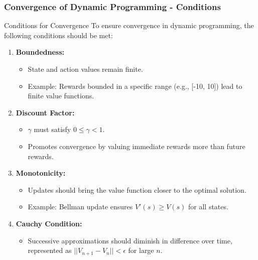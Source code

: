 \documentclass{beamer}
\begin{document}
\begin{frame}[fragile]
    \frametitle{Convergence of Dynamic Programming - Conditions}
    \begin{block}{Conditions for Convergence}
        To ensure convergence in dynamic programming, the following conditions should be met:
        \begin{enumerate}
            \item \textbf{Boundedness:} 
                \begin{itemize}
                    \item State and action values remain finite.
                    \item Example: Rewards bounded in a specific range (e.g., [-10, 10]) lead to finite value functions.
                \end{itemize}
            \item \textbf{Discount Factor:} 
                \begin{itemize}
                    \item $\gamma$ must satisfy $0 \leq \gamma < 1$.
                    \item Promotes convergence by valuing immediate rewards more than future rewards.
                \end{itemize}
            \item \textbf{Monotonicity:} 
                \begin{itemize}
                    \item Updates should bring the value function closer to the optimal solution.
                    \item Example: Bellman update ensures $V'(s) \geq V(s)$ for all states.
                \end{itemize}
            \item \textbf{Cauchy Condition:}
                \begin{itemize}
                    \item Successive approximations should diminish in difference over time, represented as $||V_{n+1} - V_n|| < \epsilon$ for large $n$.
                \end{itemize}
        \end{enumerate}
    \end{block}
\end{frame}
\end{document}
